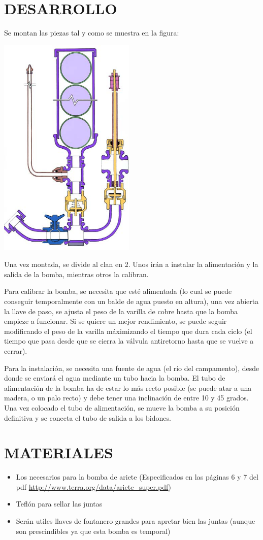 \documentclass[10pt]{article}
\newlength{\w}
\begin{document}
\section{DESARROLLO}
Se montan las piezas tal y como se muestra en la figura:
\begin{center}
\includegraphics[width=6.5cm]{images/bomba-de-ariete}
\end{center}
Una vez montada, se divide al clan en 2. Unos ir\'an a instalar la alimentaci\'on y la salida de la
bomba, mientras otros la calibran.
\par
Para calibrar la bomba, se necesita que est\'e alimentada (lo cual se puede conseguir
temporalmente con un balde de agua puesto en altura), una vez abierta la llave de paso,
se ajusta el peso de la varilla de cobre hasta que la bomba empieze a funcionar. Si se quiere
un mejor rendimiento, se puede seguir modificando el peso de la varilla m\'aximizando el tiempo
que dura cada ciclo (el tiempo que pasa desde que se cierra la v\'alvula antiretorno hasta que se
vuelve a cerrar).
\par
Para la instalaci\'on, se necesita una fuente de agua (el r\'io del campamento), desde donde se
enviar\'a el agua mediante un tubo hacia la bomba. El tubo de alimentaci\'on de la bomba ha
de estar lo m\'as recto posible (se puede atar a una madera, o un palo recto) y debe tener una
inclinaci\'on de entre 10 y 45 grados. Una vez colocado el tubo de alimentaci\'on, se mueve la
bomba a su posici\'on definitiva y se conecta el tubo de salida a los bidones.
\section{MATERIALES}
\begin{itemize}
\item Los necesarios para la bomba de ariete (Especificados en las p\'aginas 6 y 7 del pdf
{\color{blue}\url{http://www.terra.org/data/ariete_super.pdf}})
\item Tefl\'on para sellar las juntas
\item Ser\'an utiles llaves de fontanero grandes para apretar bien las juntas (aunque son
prescindibles ya que esta bomba es temporal)
\end{itemize}
\end{document}
